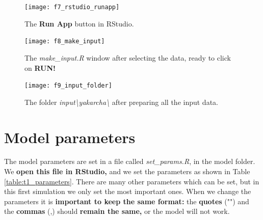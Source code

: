 \documentclass[15pt]{extarticle}
\begin{document}
\begin{figure}[h]
    \centering
    \texttt{[image: f7\_rstudio\_runapp]}
    \caption{The \textbf{Run App} button in RStudio.}
    \label{fig:f7_rstudio_runapp}
\end{figure}

\begin{figure}[hp]
    \centering
    \texttt{[image: f8\_make\_input]}
    \caption{The \textit{make\_input.R} window after selecting the data, ready to click on \textbf{RUN!}}
    \label{fig:f8_make_input}
\end{figure}

\begin{figure}[hp]
    \centering
    \texttt{[image: f9\_input\_folder]}
    \caption{The folder \textit{input\textbackslash yakarcha\textbackslash} after preparing all the input data.}
    \label{fig:f9_input_folder}
\end{figure}

\section{Model parameters}
The model parameters are set in a file called \textit{set\_params.R}, in the model folder. We \textbf{open this file in RStudio,} and we set the parameters as shown in Table \ref{table:t1_parameters}. There are many other parameters which can be set, but in this first simulation we only set the most important ones. When we change the parameters it is \textbf{important to keep the same format:} the \textbf{quotes} ("") and the \textbf{commas} (,) should \textbf{remain the same,} or the model will not work.
\end{document}
